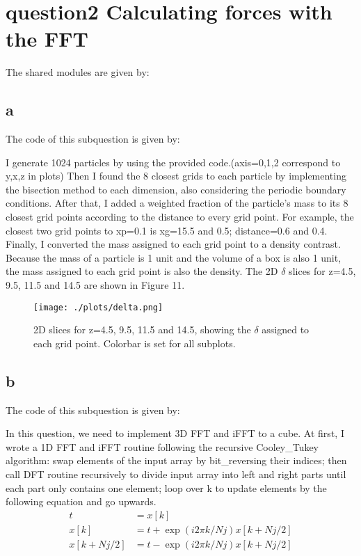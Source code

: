 \section{question2 Calculating forces with the FFT}

The shared modules are given by:


\subsection{a}
The code of this subquestion is given by:


I generate 1024 particles by using the provided code.(axis=0,1,2 correspond to y,x,z in plots) Then I found the 8 closest grids to each particle by implementing the bisection method to each dimension, also considering the periodic boundary conditions.
After that, I added a weighted fraction of the particle's mass to its 8 closest grid points according to the distance to every grid point. For example, the closest two grid points to xp=0.1 is xg=15.5 and 0.5; distance=0.6 and 0.4. Finally, I converted the mass assigned to each grid point to a density contrast. Because the mass of a particle is 1 unit and the volume of a box is also 1 unit, the mass assigned to each grid point is also the density.
The 2D $\delta$ slices for z=4.5, 9.5, 11.5 and 14.5 are shown in Figure 11.\\

\begin{figure}[h!]
  \centering
  \texttt{[image: ./plots/delta.png]}
  \caption{2D slices for z=4.5, 9.5, 11.5 and 14.5, showing the $\delta$ assigned to each grid point. Colorbar is set for all subplots.}
  \label{fig11}
\end{figure}


\subsection{b}
The code of this subquestion is given by:

In this question, we need to implement 3D FFT and iFFT to a cube. At first, I wrote a 1D FFT and iFFT routine following the recursive Cooley\_Tukey algorithm: swap elements of the input array by bit\_reversing their indices; then call DFT routine recursively to divide input array into left and right parts until each part only contains one element; loop over k to update elements by the following equation and go upwards.
\begin{equation}
  \label{eq:t}
  \begin{aligned}
    t &= x[k] \\
    x[k] &= t+\exp(i2\pi k/Nj)x[k+Nj/2] \\
    x[k+Nj/2] &= t-\exp(i2\pi k/Nj)x[k+Nj/2]
  \end{aligned}
\end{equation}

